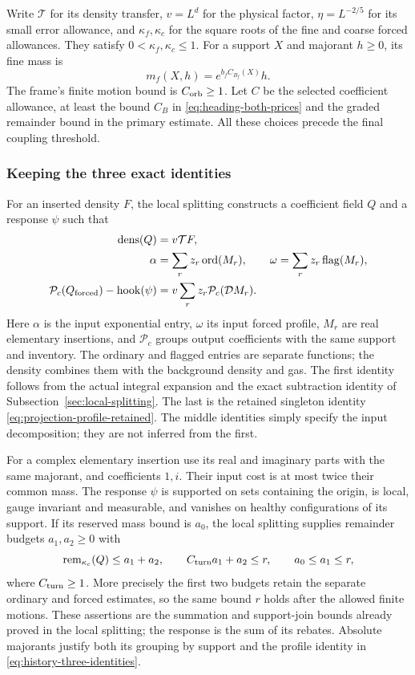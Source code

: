 Write $\mathcal T$ for its density transfer, $v=L^d$ for the
physical factor, $\eta=L^{-2/5}$ for its small error allowance,
and $\kappa_f,\kappa_c$ for the square roots of the fine and coarse
forced allowances. They satisfy $0<\kappa_f,\kappa_c\le1$.
For a support $X$ and majorant $h\ge0$, its fine mass is
\[
 m_f(X,h)=e^{b_f C_{B_f}(X)}h.
\]
The frame's finite motion bound is $C_{\rm orb}\ge1$. Let $C$
be the selected coefficient allowance, at least the bound $C_B$
in \eqref{eq:heading-both-prices} and the graded remainder bound
in the primary estimate. All these choices precede the final
coupling threshold.

\subsubsection{Keeping the three exact identities}
For an inserted density $F$, the local splitting constructs a
coefficient field $Q$ and a response $\psi$ such that
\begin{equation}\label{eq:history-three-identities}
 \begin{split}
 \operatorname{dens}(Q)&=v\mathcal T F,\\
 \alpha&=\sum_r z_r\operatorname{ord}(M_r),\qquad
 \omega=\sum_r z_r\operatorname{flag}(M_r),\\
 \mathcal P_c(Q_{\rm forced})-\operatorname{hook}(\psi)
       &=v\sum_r z_r\mathcal P_c(\mathcal D M_r).
 \end{split}
\end{equation}
Here $\alpha$ is the input exponential entry, $\omega$ its input
forced profile, $M_r$ are real elementary insertions, and
$\mathcal P_c$ groups output coefficients with the same support and
inventory. The ordinary and flagged entries are separate functions;
the density combines them with the background density and gas.
The first identity follows from the actual integral expansion and
the exact subtraction identity of Subsection~\ref{sec:local-splitting}.
The last is the retained singleton identity
\eqref{eq:projection-profile-retained}. The middle identities simply
specify the input decomposition; they are not inferred from the
first.

For a complex elementary insertion use its real and imaginary
parts with the same majorant, and coefficients $1,i$. Their input
cost is at most twice their common mass. The response $\psi$ is
supported on sets containing the origin, is local, gauge invariant
and measurable, and vanishes on healthy configurations of its
support. If its reserved mass bound is $a_0$, the local splitting
supplies remainder budgets $a_1,a_2\ge0$ with
\[
 \operatorname{rem}_{\kappa_c}(Q)\le a_1+a_2,
 \qquad C_{\rm turn}a_1+a_2\le r,
 \qquad a_0\le a_1\le r,
\]
where $C_{\rm turn}\ge1$. More precisely the first two budgets
retain the separate ordinary and forced estimates, so the same
bound $r$ holds after the allowed finite motions. These assertions
are the summation and support-join bounds already proved in the
local splitting; the response is the sum of its rebates. Absolute
majorants justify both its grouping by support and the profile
identity in \eqref{eq:history-three-identities}.

